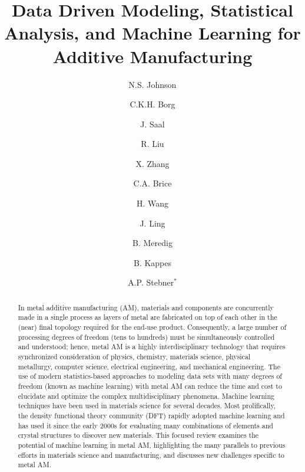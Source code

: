 \documentclass[twocolumn,superscriptaddress,nofootinbib]{revtex4-1}
\begin{document}
\title{Data Driven Modeling, Statistical Analysis, and Machine Learning for Additive Manufacturing}
\author{N.S. Johnson}

\author{C.K.H. Borg}
\author{J. Saal}

\author{R. Liu}
\author{X. Zhang}
\author{C.A. Brice}

\author{H. Wang}


\author{J. Ling}
\author{B. Meredig}

\author{B. Kappes}
\author{A.P. Stebner$^*$}


\begin{abstract}
In metal additive manufacturing (AM), materials and components are concurrently made in a single process as layers of metal are fabricated on top of each other in the (near) final topology required for the end-use product.
Consequently, a large number of processing degrees of freedom (tens to hundreds) must be simultaneously controlled and understood; hence, metal AM is a highly interdisciplinary technology that requires synchronized consideration of physics, chemistry, materials science, physical metallurgy, computer science, electrical engineering, and mechanical engineering.
The use of modern statistics-based approaches to modeling data sets with many degrees of freedom (known as machine learning) with metal AM can reduce the time and cost to elucidate and optimize the complex multidisciplinary phenomena.
Machine learning techniques have been used in materials science for several decades.
Most prolifically, the density functional theory community (DFT) rapidly adopted machine learning and has used it since the early 2000s for evaluating many combinations of elements and crystal structures to discover new materials.
This focused review examines the potential of machine learning in metal AM, highlighting the many parallels to previous efforts in materials science and manufacturing, and discusses new challenges specific to metal AM.
\end{abstract}

 
\maketitle
\tableofcontents









\end{document}

